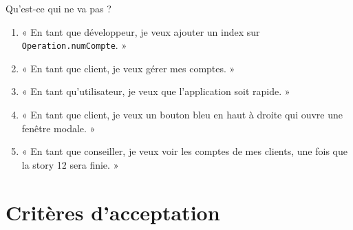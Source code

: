 \documentclass[aspectratio=169,10pt]{beamer}
\begin{document}
\begin{frame}{Qu'est-ce qui ne va pas ?}
  \small
  \begin{enumerate}
    \item « En tant que développeur, je veux ajouter un index sur \texttt{Operation.numCompte}. »
    \item « En tant que client, je veux gérer mes comptes. »
    \item « En tant qu'utilisateur, je veux que l'application soit rapide. »
    \item « En tant que client, je veux un bouton bleu en haut à droite qui ouvre une fenêtre modale. »
    \item « En tant que conseiller, je veux voir les comptes de mes clients, une fois que la story 12 sera finie. »
  \end{enumerate}
\end{frame}

\section{Critères d'acceptation}
\end{document}
